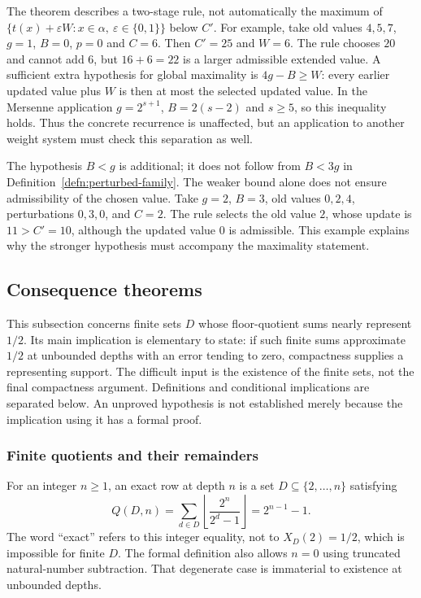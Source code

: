 The theorem describes a two-stage rule, not automatically the maximum
of $\{t(x)+\varepsilon W:x\in\alpha,\ \varepsilon\in\{0,1\}\}$
below $C'$.  For example, take old values $4,5,7$, $g=1$, $B=0$,
$p=0$ and $C=6$.  Then $C'=25$ and $W=6$.  The rule chooses
$20$ and cannot add $6$, but $16+6=22$ is a larger admissible
extended value.  A sufficient extra hypothesis for global maximality
is $4g-B\ge W$: every earlier updated value plus $W$ is then at
most the selected updated value.  In the Mersenne application
$g=2^{s+1}$, $B=2(s-2)$ and $s\ge5$, so this inequality holds.
Thus the concrete recurrence is unaffected, but an application to
another weight system must check this separation as well.

The hypothesis $B<g$ is additional; it does not follow from
$B<3g$ in Definition~\ref{defn:perturbed-family}.
The weaker bound alone does not ensure admissibility of the chosen value.
Take $g=2$, $B=3$, old values $0,2,4$, perturbations $0,3,0$, and $C=2$.
The rule selects the old value $2$, whose update is $11>C'=10$,
although the updated value $0$ is admissible.
This example explains why the stronger hypothesis must accompany
the maximality statement.
\subsection{Consequence theorems}

This subsection concerns finite sets $D$ whose floor-quotient sums nearly
represent $1/2$.  Its main implication is elementary to state: if such
finite sums approximate $1/2$ at unbounded depths with an error tending to
zero, compactness supplies a representing support.  The difficult input
is the existence of the finite sets, not the final compactness argument.
Definitions and conditional implications are separated below.  An
unproved hypothesis is not established merely because the
implication using it has a formal proof.

\subsubsection*{Finite quotients and their remainders}

\begin{defn}\label{record:257bm-d1}
For an integer $n\ge1$, an exact row at depth $n$ is a set
$D\subseteq\{2,\ldots,n\}$ satisfying
\[
 Q(D,n)=\sum_{d\in D}\left\lfloor\frac{2^n}{2^d-1}\right\rfloor
       =2^{n-1}-1.
\]
The word ``exact'' refers to this integer equality, not to
$X_D(2)=1/2$, which is impossible for finite $D$.
The formal definition also allows $n=0$ using truncated
natural-number subtraction.  That degenerate case is immaterial
to existence at unbounded depths.
\par\noindent   {}
\end{defn}

